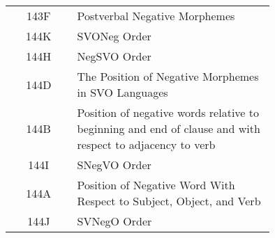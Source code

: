\begin{tabular}{|c|p{0.75\linewidth}|}
143F & Postverbal Negative Morphemes \\
144K & SVONeg Order \\
144H & NegSVO Order \\
144D & The Position of Negative Morphemes in SVO Languages \\
144B & Position of negative words relative to beginning and end of clause and with respect to adjacency to verb \\
144I & SNegVO Order \\
144A & Position of Negative Word With Respect to Subject, Object, and Verb \\
144J & SVNegO Order \\
\hline
\end{tabular}
